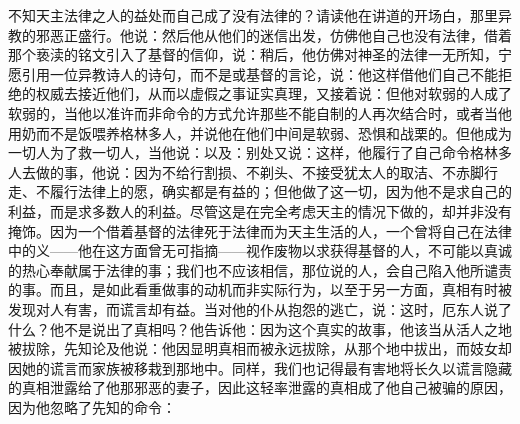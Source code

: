 不知天主法律之人的益处而自己成了没有法律的？请读他在讲道的开场白，那里异教的邪恶正盛行。他说：然后他从他们的迷信出发，仿佛他自己也没有法律，借着那个亵渎的铭文引入了基督的信仰，说：稍后，他仿佛对神圣的法律一无所知，宁愿引用一位异教诗人的诗句，而不是或基督的言论，说：他这样借他们自己不能拒绝的权威去接近他们，从而以虚假之事证实真理，又接着说：\newline{}\newline{}\newline{}但他对软弱的人成了软弱的，当他以准许而非命令的方式允许那些不能自制的人再次结合时，或者当他用奶而不是饭喂养格林多人，并说他在他们中间是软弱、恐惧和战栗的。但他成为一切人为了救一切人，当他说：以及：别处又说：这样，他履行了自己命令格林多人去做的事，他说：\newline{}\newline{}因为不给行割损、不剃头、不接受犹太人的取洁、不赤脚行走、不履行法律上的愿，确实都是有益的；但他做了这一切，因为他不是求自己的利益，而是求多数人的利益。尽管这是在完全考虑天主的情况下做的，却并非没有掩饰。因为一个借着基督的法律死于法律而为天主生活的人，一个曾将自己在法律中的义——他在这方面曾无可指摘——视作废物以求获得基督的人，不可能以真诚的热心奉献属于法律的事；我们也不应该相信，那位说的人，会自己陷入他所谴责的事。\newline{}\newline{}而且，是如此看重做事的动机而非实际行为，以至于另一方面，真相有时被发现对人有害，而谎言却有益。当对他的仆从抱怨的逃亡，说：这时，厄东人说了什么？他不是说出了真相吗？他告诉他：因为这个真实的故事，他该当从活人之地被拔除，先知论及他说：他因显明真相而被永远拔除，从那个地中拔出，而妓女却因她的谎言而家族被移栽到那地中。同样，我们也记得最有害地将长久以谎言隐藏的真相泄露给了他那邪恶的妻子，因此这轻率泄露的真相成了他自己被骗的原因，因为他忽略了先知的命令：\par

